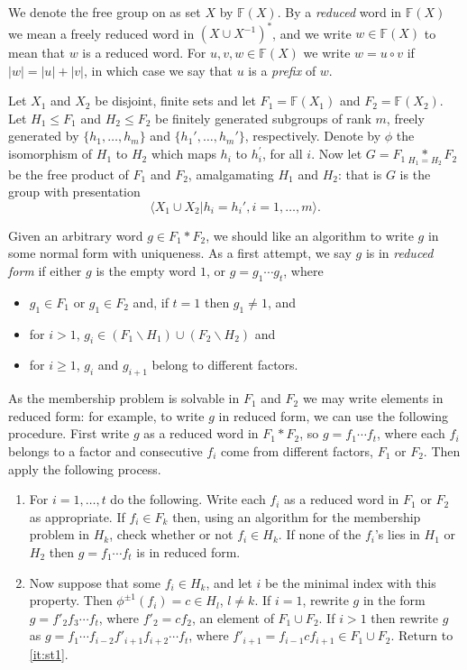 \documentclass[a4paper,12pt]{article}
\numberwithin{equation}{section}
\numberwithin{figure}{section}
\newcommand{\FF}{\ensuremath{\mathbb{F}}}
\newcommand{\la}{\langle}
\newcommand{\ra}{\rangle}
\newcommand{\be}{\begin{enumerate}}
\newcommand{\ee}{\end{enumerate}}
\begin{document}
We denote the free group on as set $X$ by $\FF(X)$.
 By a {\em reduced} word in $\FF(X)$  we mean
 a freely reduced word in $(X\cup X^{-1})^\ast$, and we write $w\in \FF(X)$
to mean that $w$ is a reduced word. For $u,v, w\in \FF(X)$ we
write $w=u\circ v$ if $|w|=|u|+|v|$, in which case we say that $u$ is a {\em prefix}
of $w$.

Let $X_1$ and $X_2$ be disjoint,
finite sets and let
$F_1=\FF(X_1)$ and $F_2=\FF(X_2)$.
Let $H_1 \leq F_1$ and  $H_2 \leq F_2$ be finitely generated subgroups of rank $m$,
freely generated by $\{h_1,\ldots, h_m\}$ and  $\{h_1', \ldots, h_m'\}$, respectively.
Denote by $\phi$ the isomorphism of $H_1$ to $H_2$ which maps $h_i$ to  $h_i^\prime$,
for all $i$.
 Now let $G = F_1 \underset{H_1=H_2}{\ast} F_2$ be the free product  of $F_1$ and $F_2$, amalgamating $H_1$ and $H_2$: that is $G$ is the group
 with
 presentation \[\la X_1\cup X_2 | h_i = h_i', i=1, \ldots ,m\ra.\]

Given an arbitrary word $g\in F_1\ast F_2$,
we should like an algorithm to write $g$ in
some normal form with uniqueness. As a first attempt,
 we say $g$ is in \emph{reduced form} if either $g$ is the empty word $1$, or $g = g_1 \cdots g_t$, where
\begin{itemize}
\item
$g_1 \in F_1$ or $g_1 \in F_2$ and, if $t=1$ then $g_1\neq 1$,  and
\item
for
$i > 1$,    $g_i \in (F_1 \backslash H_1)\cup (F_2\backslash H_2)$ and
\item for $i\ge 1$,   $g_i$
and  ${g_{i+1}}$ belong to  different factors.
\end{itemize}
As the membership problem
is solvable in $F_1$ and $F_2$ we may write elements in reduced form: for example,
to write $g$ in reduced form,
we can use the following procedure.
First write $g$  as a reduced word in $F_1\ast F_2$, so $g=f_1\cdots f_t$, where
each $f_i$ belongs to a factor and
consecutive $f_i$ come from different factors, $F_1$ or $F_2$. Then apply the
following process.
\be[Step 1]
\item\label{it:st1} For $i=1,\ldots ,t$ do the following.
Write each $f_i$ as  a reduced word in $F_1$ or $F_2$ as appropriate.
If $f_i\in F_k$ then,
using an algorithm for the membership problem in $H_k$, check whether or not $f_i \in H_k$.
 If none of the $f_i$'s lies in $H_1$ or $H_2$ then
$g= f_1 \cdots f_t$ is in  reduced form.
\item  Now suppose that some $f_i \in H_k$,  and let  $i$ be the
minimal index with this property. Then $\phi^{\pm 1}(f_i)=c\in H_{l}$, $l\neq k$.
If $i = 1$, rewrite $g$  in the
form $g = f'_2 f_3 \cdots f_t$,  where  $f'_2 = cf_2$, an element of $F_1\cup F_2$.
If $i > 1$ then rewrite $g$ as
$g = f_1 \cdots f_{i-2} f'_{i+1}f_{i+2} \cdots f_t$, where
$f'_{i+1} = f_{i-1}c f_{i+1}\in F_1\cup F_2$. Return to
\ref{it:st1}.
\ee
\end{document}
